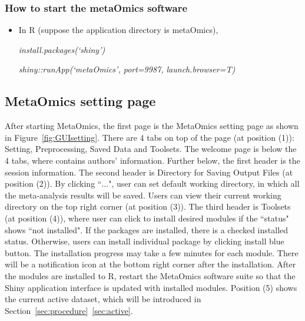\subsubsection{How to start the metaOmics software}
\begin{itemize}
\item In R (suppose the application directory is metaOmics),

\textit{install.packages(`shiny')}

\textit{shiny::runApp(`metaOmics', port=9987, launch.browser=T)}
\end{itemize}

\subsection{MetaOmics setting page}
\label{sec:setting}
After starting MetaOmics, 
the first page is the MetaOmics setting page as shown in Figure~\ref{fig:GUIsetting}.  
There are 4 tabs on top of the page (at position {\color{red} (1)}): Setting, Preprocessing, Saved Data and Toolsets.
The welcome page is below the 4 tabs, where contains authors' information.
Further below, the first header is the session information.
The second header is Directory for Saving Output Files (at position {\color{red} (2)}).
By clicking ``$\ldots$",
user can set default working directory, in which all the meta-analysis results will be saved.
Users can view their current working directory on the top right corner (at position {\color{red} (3)}).
The third header is Toolsets (at position {\color{red} (4)}),
where user can click to install desired modules if the ``status" shows ``not installed".
If the packages are installed, there is a checked installed status.
Otherwise, users can install individual package by clicking install blue button.
The installation progress may take a few minutes for each module.
There will be a notification icon at the bottom right corner after the installation. 
After the modules are installed to R, restart the MetaOmics software suite so that the Shiny application interface is updated with installed modules.
Position {\color{red} (5)} shows the current active dataset, which will be introduced in Section~\ref{sec:procedure}~\ref{sec:active}. 
 
